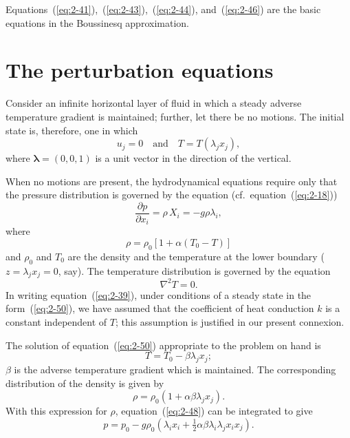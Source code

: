 Equations~(\ref{eq:2-41}),~(\ref{eq:2-43}),~(\ref{eq:2-44}), and~(\ref{eq:2-46}) are the basic equations in the
Boussinesq approximation.

\section{The perturbation equations}\label{sec:9}

Consider an infinite horizontal layer of fluid in which a steady adverse
temperature gradient is maintained; further, let there be no motions.
The initial state is, therefore, one in which
\begin{equation}
\label{eq:2-47}
u_j = 0 \quad\text{and}\quad T = T(\lambda_j x_j),
\end{equation}
where $\boldsymbol{\lambda} = (0,0,1)$ is a unit vector in the direction of the vertical.

When no motions are present, the hydrodynamical equations require
only that the pressure distribution is governed by the equation (cf.\
equation~(\ref{eq:2-18}))
\begin{equation}
\label{eq:2-48}
\frac{\partial p}{\partial x_i} = \rho\,X_i = -g\rho\lambda_i,
\end{equation}
where
\begin{equation}
\label{eq:2-49}
\rho = \rho_0[1 + \alpha(T_0 - T)]
\end{equation}
and $\rho_0$ and $T_0$ are the density and the temperature at the lower boundary
($z = \lambda_j x_j = 0$, say). The temperature distribution is governed by the
equation
\begin{equation}
\label{eq:2-50}
\nabla^2 T = 0.
\end{equation}
In writing equation~(\ref{eq:2-39}), under conditions of a steady state in the form~(\ref{eq:2-50}), we have assumed that the coefficient of heat conduction $k$ is a
constant independent of $T$; this assumption is justified in our present
connexion.

The solution of equation~(\ref{eq:2-50}) appropriate to the problem on hand is
\begin{equation}
\label{eq:2-51}
T = T_0 - \beta\lambda_j x_j;
\end{equation}
$\beta$ is the adverse temperature gradient which is maintained. The corresponding distribution of the density is given by
\begin{equation}
\label{eq:2-52}
\rho = \rho_0(1 + \alpha\beta\lambda_j x_j).
\end{equation}
With this expression for $\rho$, equation~(\ref{eq:2-48}) can be integrated to give
\begin{equation}
\label{eq:2-53}
p = p_0 - g\rho_0(\lambda_i x_i + \tfrac{1}{2}\alpha\beta\lambda_i\lambda_j x_i x_j).
\end{equation}

